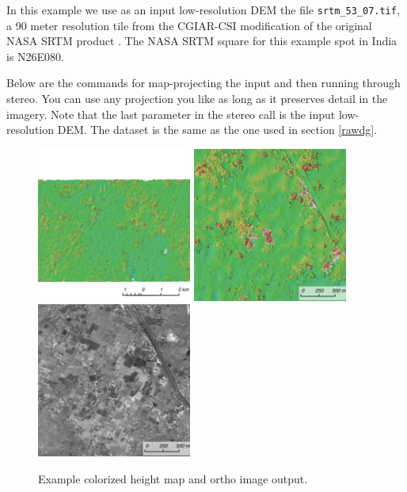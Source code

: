 In this example we use as an input low-resolution DEM the file
\texttt{srtm\_53\_07.tif}, a 90 meter resolution tile from the CGIAR-CSI
modification of the original NASA SRTM product \cite{cgiar:srtm90m}.
The NASA SRTM square for this example spot in India is N26E080.

Below are the commands for map-projecting the input and then running
through stereo. You can use any projection you like as long as it
preserves detail in the imagery. Note that the last parameter in the
stereo call is the input low-resolution DEM. The dataset is the same
as the one used in section \ref{rawdg}.

\begin{figure}[h!]
\centering
  \includegraphics[width=2.0in]{images/examples/dg/MappedContext_400px.png}
  \includegraphics[width=2.0in]{images/examples/dg/MappedCloseUp_400px.png}
  \includegraphics[width=2.0in]{images/examples/dg/MappedCloseUpDRG_400px.png}
\caption{Example colorized height map and ortho image output.}
\label{fig:dg-map-example}
\end{figure}

